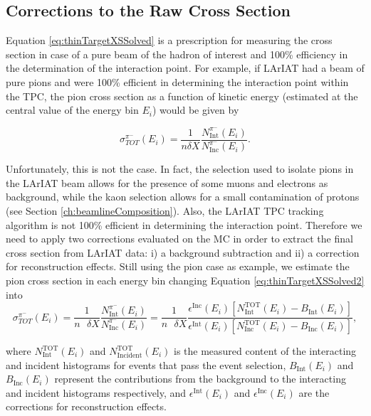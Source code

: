 \subsection{Corrections to the Raw Cross Section}\label{ch:MCCorrections}
Equation \ref{eq:thinTargetXSSolved}  is a prescription for measuring the cross section in case of a pure beam of the hadron of interest and 100\% efficiency in the determination of the interaction point.  For example, if LArIAT had a beam of pure pions and were 100\% efficient in determining the interaction point within the TPC, the pion cross section as a function of  kinetic energy (estimated at the central value of the energy bin $E_i$) would be given by

\begin{equation}
 \sigma^{\pi^-}_{TOT}(E_{i})  = \frac{1}{n \delta X}\frac{N^{\pi^-}_{ \text{Int}} (E_{i})}{N^{\pi^-}_{ \text{Inc}}(E_{i})}.
\label{eq:thinTargetXSSolved2}
\end{equation}

Unfortunately, this is not the case. In fact, the selection used to isolate pions in the LArIAT beam allows for the presence of some muons and electrons as background, while the kaon selection allows for a small contamination of protons (see Section \ref{ch:beamlineComposition}). Also, the LArIAT TPC tracking algorithm is not 100\% efficient in determining the interaction point. Therefore we need to apply two corrections evaluated on the MC in order to extract the final cross section from LArIAT data: i) a background subtraction and ii) a correction for reconstruction effects. 
Still using the pion case as example, we estimate the pion cross section in each energy bin changing  Equation \ref{eq:thinTargetXSSolved2} into
\begin{equation}
 \sigma^{\pi^-}_{TOT}(E_{i})  =\frac{1}{n\text{ } \delta X}\frac{N^{\pi^-}_{ \text{Int}} (E_{i})}{N^{\pi^-}_{ \text{Inc}}(E_{i})} = \frac{1}{n \text{ }\delta X}\frac{ \epsilon^{\text{Inc}}(E_i) [ N^{ \text{TOT}}_{ \text{Int}} (E_{i}) - B_{ \text{Int}} (E_i)] }{   \epsilon^{\text{Int}}(E_i) [N^{ \text{TOT}}_{ \text{Inc}}(E_{i}) - B_{ \text{Inc}} (E_i)]},
\label{eq:True}
\end{equation}



 
where  $N^{\text{TOT}}_{\text{Int}} (E_{i})$ and $N^{\text{TOT}}_{\text{Incident}} (E_{i})$ is the measured content of the interacting and incident histograms for events that pass the event selection, $B_{\text{Int}} (E_i)$ and $B_{\text{Inc}} (E_i)$ represent the contributions from the background to the interacting and incident histograms respectively, and  $\epsilon^{\text{Int}}(E_i)$ and  $\epsilon^{\text{Inc}}(E_i)$ are the corrections for reconstruction effects.

